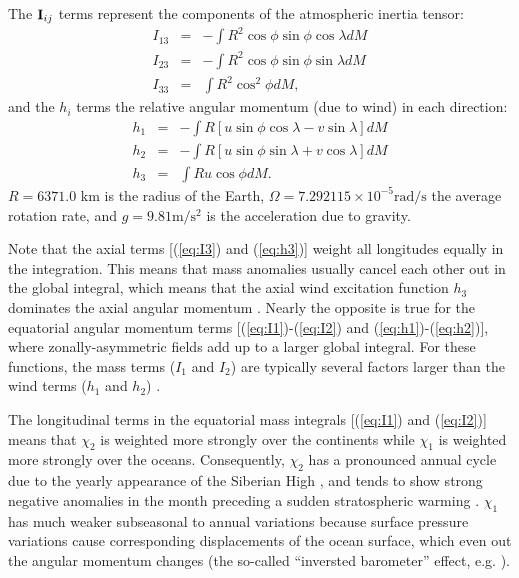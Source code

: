The ${\bf I}_{ij}$ terms represent the components of the atmospheric inertia tensor:
\begin{eqnarray}
  I_{13} &=& -\int R^2 \cos \phi \sin \phi \cos \lambda dM 
  \label{eq:I1}\\
  I_{23} &=& -\int R^2 \cos \phi \sin \phi \sin \lambda dM 
  \label{eq:I2}\\
  I_{33} &=&  \int R^2 \cos^2 \phi dM ,
  \label{eq:I3}
\end{eqnarray}
and the $h_i$ terms the relative angular momentum (due to wind) in each direction:
\begin{eqnarray}
  h_{1}  &=& -\int R \left[u \sin \phi \cos \lambda - v \sin \lambda \right] dM 
    \label{eq:h1}\\
  h_{2}  &=& -\int R \left[u \sin \phi \sin \lambda + v \cos \lambda \right] dM 
    \label{eq:h2}\\
  h_{3}  &=&  \int R u \cos \phi dM.
    \label{eq:h3}
\end{eqnarray}
%
$R = 6371.0$ km is the radius of the Earth, $\Omega = 7.292115\times 10^{-5} \text{rad}/\text{s}$ the average rotation rate, and $g = 9.81 \text{m}/\text{s}^2$ is the acceleration due to gravity.

Note that the axial terms [(\ref{eq:I3}) and (\ref{eq:h3})] weight all longitudes equally in the integration.
This means that mass anomalies usually cancel each other out in the global integral, which means that the axial wind excitation function $h_3$ dominates the axial angular momentum  \citep{barnesetal1983}.
%
Nearly the opposite is true for the equatorial angular momentum terms [(\ref{eq:I1})-(\ref{eq:I2}) and (\ref{eq:h1})-(\ref{eq:h2})], where zonally-asymmetric fields add up to a larger global integral.
For these functions, the mass terms ($I_1$ and $I_2$) are typically several factors larger than the wind terms ($h_1$ and $h_2$)  \citep{barnesetal1983}.

The longitudinal terms in the equatorial mass integrals [(\ref{eq:I1}) and (\ref{eq:I2})] means that $\chi_2$ is weighted more strongly over the continents while $\chi_1$ is weighted more strongly over the oceans.
Consequently, $\chi_2$ has a pronounced annual cycle due to the yearly appearance of the Siberian High \citep{dobslawetal2010}, and tends to show strong negative anomalies in the month preceding a sudden stratospheric warming \citep{Neef2014}.
$\chi_1$ has much weaker subseasonal to annual variations because surface pressure variations cause corresponding displacements of the ocean surface, which even out the angular momentum changes (the so-called ``inversted barometer'' effect, e.g. \citet{salsteinrosen1989}).

